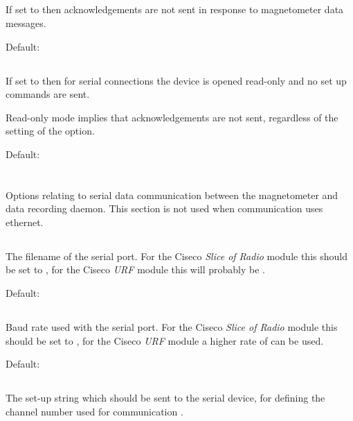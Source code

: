 \subsection{}
If set to  then acknowledgements are not sent in response
to magnetometer data messages.

Default: 

\subsection{}
If set to  then for serial connections the device is opened
read-only and no set up commands are sent.

Read-only mode implies that acknowledgements are not sent, regardless
of the setting of the  option.

Default: 

\section{\code{[serial]}}
Options relating to serial data communication between the magnetometer
and data recording daemon. This section is not used when communication
uses ethernet.

\subsection{}
The filename of the serial port. For the Ciseco \emph{Slice of Radio} module
this should be set to , for the Ciseco
\emph{URF} module this will probably be .

Default: 

\subsection{}
Baud rate used with the serial port. For the Ciseco \emph{Slice of
  Radio} module this should be set to , for the Ciseco
\emph{URF} module a higher rate of  can be used.

Default: 

\subsection{}
The set-up string which should be sent to the serial device, for
defining the channel number used for communication \etc.

